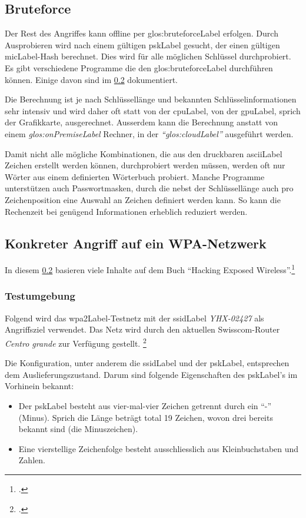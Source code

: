 \subsection{Bruteforce}
Der Rest des Angriffes kann offline per \gls{glos:bruteforceLabel} erfolgen. Durch Ausprobieren wird nach einem gültigen \gls{pskLabel} gesucht, der einen gültigen \gls{micLabel}-Hash berechnet. Dies wird für alle möglichen Schlüssel durchprobiert.
Es gibt verschiedene Programme die den \gls{glos:bruteforceLabel} durchführen können.
Einige davon sind im \cref{subsec:wpa_attack_tutorial} dokumentiert.

Die Berechnung ist je nach Schlüssellänge und bekannten Schlüsselinformationen sehr intensiv und wird daher oft statt von der \gls{cpuLabel}, von der \gls{gpuLabel}, sprich der Grafikkarte, ausgerechnet.
Ausserdem kann die Berechnung anstatt von einem \textit{\gls{glos:onPremiseLabel}} Rechner, in der \textit{"`\gls{glos:cloudLabel}"'} ausgeführt werden.

Damit nicht alle mögliche Kombinationen, die aus den druckbaren \gls{asciiLabel} Zeichen erstellt werden können, durchprobiert werden müssen, werden oft nur Wörter aus einem definierten Wörterbuch probiert.
Manche Programme unterstützen auch Passwortmasken, durch die nebst der Schlüssellänge auch pro Zeichenposition eine Auswahl an Zeichen definiert werden kann. So kann die Rechenzeit bei genügend Informationen erheblich reduziert werden.


\subsection{Konkreter Angriff auf ein WPA-Netzwerk}
\label{subsec:wpa_attack_tutorial}

In diesem \cref{subsec:wpa_attack_tutorial} basieren viele Inhalte auf dem Buch "`Hacking Exposed Wireless"'.\footcite[][148ff.]{WrightCache201503}

\subsubsection{Testumgebung}
\label{subsubsec:wpa_test_environment}

Folgend wird das \gls{wpa2Label}-Testnetz mit der \gls{ssidLabel} \textit{YHX-02427} als Angriffsziel verwendet.
Das Netz wird durch den aktuellen Swisscom-Router \textit{Centro grande} zur Verfügung gestellt. \footcite{Centro_grande_Analog_Standard_-_WLAN_Router_Swisscom_2015-04-15}

Die Konfiguration, unter anderem die \gls{ssidLabel} und der \gls{pskLabel}, entsprechen dem Auslieferungszustand.
Darum sind folgende Eigenschaften des \gls{pskLabel}'s im Vorhinein bekannt:
\begin{itemize}
	\item Der \gls{pskLabel} besteht aus vier-mal-vier Zeichen getrennt durch ein "`-"' (Minus). Sprich die Länge beträgt total 19 Zeichen, wovon drei bereits bekannt sind (die Minuszeichen).
	\item Eine vierstellige Zeichenfolge besteht ausschliesslich aus Kleinbuchstaben und Zahlen.
\end{itemize}

